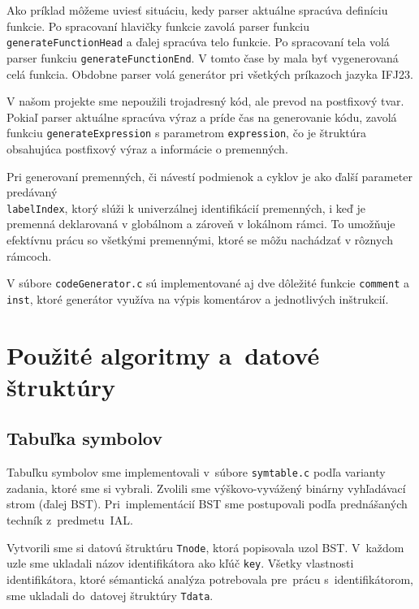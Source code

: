 \documentclass[a4paper, 11pt]{article}
\begin{document}
Ako príklad môžeme uviesť situáciu, kedy parser aktuálne spracúva definíciu funkcie. Po spracovaní hlavičky funkcie zavolá parser funkciu \texttt{generateFunctionHead} a ďalej spracúva telo funkcie. Po spracovaní tela volá parser funkciu \texttt{generateFunctionEnd}. V tomto čase by mala byť vygenerovaná celá funkcia. Obdobne parser volá generátor pri všetkých príkazoch jazyka IFJ23.

V našom projekte sme nepoužili trojadresný kód, ale prevod na postfixový tvar. Pokiaľ parser aktuálne spracúva výraz a príde čas na generovanie kódu, zavolá funkciu \texttt{generateExpression} s parametrom \texttt{expression}, čo je štruktúra obsahujúca postfixový výraz a informácie o premenných.

Pri generovaní premenných, či návestí podmienok a cyklov je ako ďalší parameter predávaný\\ \texttt{labelIndex}, ktorý slúži k univerzálnej identifikácií premenných, i keď je premenná deklarovaná v globálnom a zároveň v lokálnom rámci. To umožňuje efektívnu prácu so všetkými premennými, ktoré se môžu nachádzať v rôznych rámcoch.

V súbore \texttt{codeGenerator.c} sú implementované aj dve dôležité funkcie \texttt{comment} a \texttt{inst}, ktoré generátor využíva na výpis komentárov a jednotlivých inštrukcií.



\section{Použité algoritmy a~datové štruktúry}

\subsection{Tabuľka symbolov}
\label{subsec:symtable}
    Tabuľku symbolov sme implementovali v~súbore \texttt{symtable.c} podľa varianty zadania, ktoré sme si vybrali. Zvolili sme výškovo-vyvážený binárny vyhľadávací strom (ďalej BST). Pri~implementácií BST sme postupovali podľa prednášaných techník z~predmetu~IAL.
    
    Vytvorili sme si datovú štruktúru \texttt{Tnode}, ktorá popisovala uzol BST. V~každom uzle sme ukladali názov identifikátora ako kľúč \texttt{key}. Všetky vlastnosti identifikátora, ktoré sémantická analýza potrebovala
    pre~prácu s~identifikátorom, sme ukladali do~datovej štruktúry \texttt{Tdata}.
\end{document}
